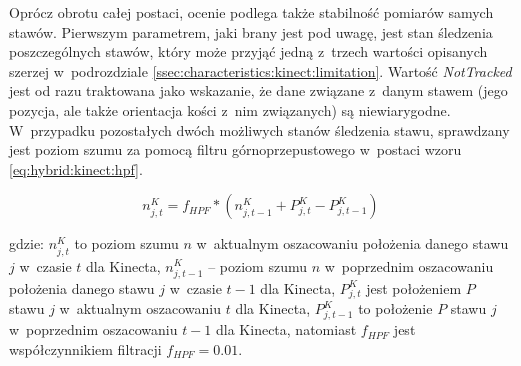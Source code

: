Oprócz obrotu całej postaci, ocenie podlega także stabilność pomiarów samych stawów. Pierwszym parametrem, jaki brany jest pod uwagę, jest stan śledzenia poszczególnych stawów, który może przyjąć jedną z~trzech wartości opisanych szerzej w~podrozdziale \ref{ssec:characteristics:kinect:limitation}. Wartość \emph{NotTracked} jest od razu traktowana jako wskazanie, że dane związane z~danym stawem (jego pozycja, ale także orientacja kości z~nim związanych) są niewiarygodne. W~przypadku pozostałych dwóch możliwych stanów śledzenia stawu, sprawdzany jest poziom szumu za pomocą filtru górnoprzepustowego w~postaci wzoru \ref{eq:hybrid:kinect:hpf}. 
														
\begin{equation}
	n^K_{j,t} = f_{HPF} * (n^K_{j,t-1} + P^K_{j,t} - P^K_{j,t-1}) 
	\label{eq:hybrid:kinect:hpf}
\end{equation}
														
gdzie: $n^K_{j,t}$ to poziom szumu $n$ w~aktualnym oszacowaniu położenia danego stawu $j$ w~czasie $t$ dla Kinecta, $n^K_{j,t-1}$ -- poziom szumu $n$ w~poprzednim oszacowaniu położenia danego stawu $j$ w~czasie $t-1$ dla Kinecta,	$P^K_{j,t}$ jest położeniem $P$ stawu $j$ w~aktualnym oszacowaniu $t$ dla Kinecta, $P^K_{j,t-1}$ to położenie  $P$ stawu $j$ w~poprzednim oszacowaniu $t-1$ dla Kinecta, natomiast $f_{HPF}$ jest współczynnikiem filtracji  $f_{HPF} = 0.01$. 
												
